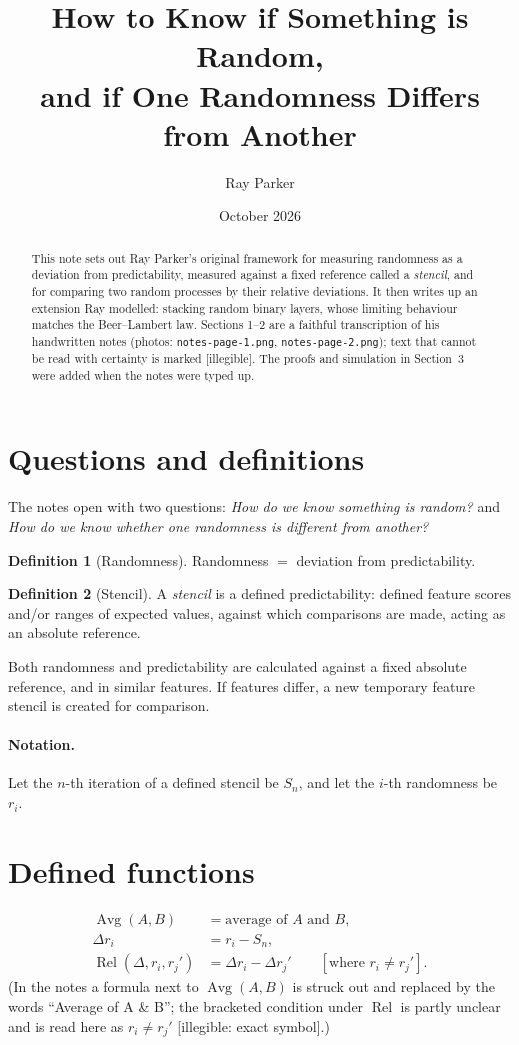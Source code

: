 \documentclass[11pt,a4paper]{article}
\title{How to Know if Something is Random,\\ and if One Randomness Differs from Another}
\author{Ray Parker}
\date{October 2026}
\theoremstyle{definition}\newtheorem{definition}{Definition}
\begin{document}
\maketitle
\begin{abstract}
This note sets out Ray Parker's original framework for measuring randomness as a deviation from predictability, measured against a fixed reference called a \emph{stencil}, and for comparing two random processes by their relative deviations. It then writes up an extension Ray modelled: stacking random binary layers, whose limiting behaviour matches the Beer--Lambert law. Sections 1--2 are a faithful transcription of his handwritten notes (photos: \texttt{notes-page-1.png}, \texttt{notes-page-2.png}); text that cannot be read with certainty is marked [illegible]. The proofs and simulation in Section~3 were added when the notes were typed up.
\end{abstract}

\section{Questions and definitions}
The notes open with two questions: \emph{How do we know something is random?} and \emph{How do we know whether one randomness is different from another?}

\begin{definition}[Randomness]
Randomness $=$ deviation from predictability.
\end{definition}
\begin{definition}[Stencil]
A \emph{stencil} is a defined predictability: defined feature scores and/or ranges of expected values, against which comparisons are made, acting as an absolute reference.
\end{definition}
Both randomness and predictability are calculated against a fixed absolute reference, and in similar features. If features differ, a new temporary feature stencil is created for comparison.

\paragraph{Notation.} Let the $n$-th iteration of a defined stencil be $S_n$, and let the $i$-th randomness be $r_i$.

\section{Defined functions}
\begin{align}
\operatorname{Avg}(A,B) &= \text{average of } A \text{ and } B, \\
\Delta r_i &= r_i - S_n, \\
\operatorname{Rel}(\Delta, r_i, r_j') &= \Delta r_i - \Delta r_j' \qquad [\text{where } r_i \neq r_j'].
\end{align}
(In the notes a formula next to $\operatorname{Avg}(A,B)$ is struck out and replaced by the words ``Average of A \& B''; the bracketed condition under $\operatorname{Rel}$ is partly unclear and is read here as $r_i \neq r_j'$ [illegible: exact symbol].)
\end{document}
